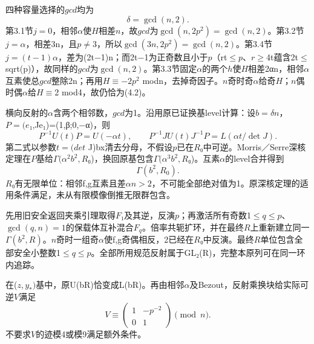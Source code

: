 \documentclass[11pt,a4paper]{article}
\theoremstyle{definition}
\numberwithin{equation}{section}
\begin{document}
{四种容量选择的\ensuremath{gcd}均为} \[
\boxed{\delta=\gcd(n,2).}
\tag{C18.4.2}
\] {第3.1节\ensuremath{j=0}，相邻\ensuremath{\alpha }使\ensuremath{H}相差\ensuremath{n}，故\ensuremath{gcd}为\ensuremath{\operatorname{gcd}(n,2p^{2})=\operatorname{gcd}(n,2)}。第3.2节\ensuremath{j=\alpha }，相差3n，且\ensuremath{p}\ensuremath{\ne}3，所以\ensuremath{\operatorname{gcd}(3n,2p^{2})=\operatorname{gcd}(n,2)}。第3.4节\ensuremath{j=(t-1)\alpha }，差为(2t−1)n；而2t−1为正奇数且小于\ensuremath{p}（rt\ensuremath{\le}\ensuremath{p}、\ensuremath{r}\ensuremath{\ge}4t蕴含2t\ensuremath{\le}sqrt(p)），故同样的\ensuremath{gcd}为\ensuremath{\operatorname{gcd}(n,2)}。第3.3节固定\ensuremath{\alpha }的两个\ensuremath{h}使\ensuremath{H}相差2αn，相邻\ensuremath{\alpha }互素使总\ensuremath{gcd}整除2n；再用\ensuremath{H}\ensuremath{\equiv}−\ensuremath{2p^{2}}} {modn，去掉奇因子。\ensuremath{n}奇时奇\ensuremath{\alpha }给奇\ensuremath{H}；\ensuremath{n}偶时偶\ensuremath{\alpha }给\ensuremath{H}\ensuremath{\equiv}2} {mod4，故仍恰为(4.2)。}

{横向反射的\ensuremath{\alpha }含两个相邻数，\ensuremath{gcd}为1。沿用原已证换基level计算：设\ensuremath{b=\delta n}，\ensuremath{P=(e}₁,Je₁)=(1,β;0,−α)，则} \[
P^{-1}U(t)P=U(-\alpha t),\qquad
P^{-1}JU(t)J^{-1}P=L(\alpha t/\det J).
\] {第二式以参数\ensuremath{t=(det}} {J)bx清去分母，不假设\ensuremath{p}已在\ensuremath{R}₀中可逆。Morris／Serre深核定理在\ensuremath{P}基给\ensuremath{\Gamma (\alpha ^{2}b^{2},R}₀)，换回原基包含\ensuremath{\Gamma (\alpha ^{3}b^{2},R}₀)。互素\ensuremath{\alpha }的level合并得到} \[
\boxed{\Gamma(b^2,R_0).}
\tag{C18.4.3}
\] {\ensuremath{R}₀有无限单位：相邻f,g互素且差\ensuremath{\alpha n>2}，不可能全部绝对值为1。原深核定理的适用条件满足，未从有限模像倒推无限群包含。}

{先用旧安全返回夹乘引理取得\ensuremath{F}₁及其逆，反演\ensuremath{p}；再激活所有奇数1\ensuremath{\le}\ensuremath{q}\ensuremath{\le}\ensuremath{p}、\ensuremath{\operatorname{gcd}(q,n)=1}的保载体互补混合\ensuremath{F_{q}}。倍率共轭扩环，并在最终\ensuremath{R}上重新建立同一\ensuremath{\Gamma (b^{2},R)}。\ensuremath{n}奇时一组奇\ensuremath{\alpha }使f,g奇偶相反，2已经在\ensuremath{R}₀中反演。最终\ensuremath{R}单位包含全部安全小整数1\ensuremath{\le}\ensuremath{q}\ensuremath{\le}\ensuremath{p}。全部所用规范反射属于GL₂(R)，完整本原列可在同一环内追踪。}

{在(\ensuremath{z,y_*)}基中，原U(bR)恰变成L(bR)。再由相邻\ensuremath{\alpha }及Bezout，反射乘换块给实际可逆\ensuremath{V}满足} \[
V\equiv\begin{pmatrix}1&-p^{-2}\\0&1\end{pmatrix}\pmod n.
\tag{C18.4.4}
\] {不要求\ensuremath{V}的迹模4或模9满足额外条件。}
\end{document}

